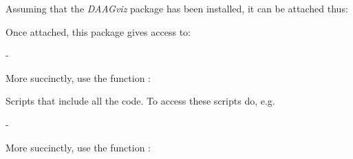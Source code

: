 \begin{marginfigure}Assuming that the {\em DAAGviz} package has been installed, it can be attached thus:
\begin{knitrout}
\color{fgcolor}\begin{kframe}
\begin{alltt}
\end{alltt}
\end{kframe}
\end{knitrout}
\end{marginfigure}
Once attached, this package gives access to:
\begin{itemizz}
\item[-]
\begin{marginfigure}[78pt]
More succinctly, use the function :\\[-3pt]
\begin{knitrout}
\color{fgcolor}\begin{kframe}
\begin{alltt}
\hlstd{(}\hlstd{)}
\end{alltt}
\end{kframe}
\end{knitrout}
\end{marginfigure}
Scripts that include all the code. To access these scripts do, e.g.
\begin{knitrout}
\color{fgcolor}\begin{kframe}
\begin{alltt}
\hlstd{(}\hlstd{(}\hlstd{,} \hlstd{=}\hlstd{))}
 \hlkwb{<-} \hlstd{(}\hlstd{,}
                        \hlstd{=}\hlstd{)}
\end{alltt}
\end{kframe}
\end{knitrout}
\item[-]
\begin{marginfigure}[24pt]
More succinctly, use the function :\\[-3pt]
\begin{knitrout}

\end{knitrout}
\end{marginfigure}
\end{itemizz}
